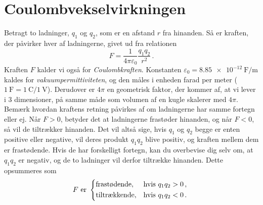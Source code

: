 \section{Coulombvekselvirkningen}
Betragt to ladninger, $q_1$ og $q_2$, som er en afstand $r$ fra hinanden. Så er kraften, der påvirker hver af ladningerne, givet ud fra relationen
\begin{equation}
    F=\frac{1}{4\pi\varepsilon_0}\frac{q_1q_2}{r^2} \, .
\end{equation}
Kraften $F$ kalder vi også for \emph{Coulombkraften}. Konstanten $\varepsilon_0=\SI{8.85e-12}{\farad\per\meter}$ kaldes for \emph{vakuumpermittiviteten}, og den måles i enheden farad per meter ($\SI{1}{\farad}=\SI{1}{\coulomb}/\SI{1}{\volt}$). Derudover er $4\pi$ en geometrisk faktor, der kommer af, at vi lever i 3 dimensioner, på samme måde som volumen af en kugle skalerer med $4\pi$. Bemærk hvordan kraftens retning påvirkes af om ladningerne har samme fortegn eller ej. Når $F>0$, betyder det at ladningerne frastøder hinanden, og når $F<0$, så vil de tiltrækker hinanden. Det vil altså sige, hvis $q_1$ og $q_2$ begge er enten positive eller negative, vil deres produkt $q_1q_2$ blive positiv, og kraften mellem dem er frastødende. Hvis de har forskelligt fortegn, kan du overbevise dig selv om, at $q_1q_2$ er negativ, og de to ladninger vil derfor tiltrække hinanden. Dette opsummeres som
\begin{equation}
    F\text{ er }
    \begin{cases*}
    \text{frastødende},& hvis $q_1q_2>0 \, ,$\\
    \text{tiltrækkende},& hvis $q_1q_2<0 \, .$
    \end{cases*}
\end{equation}

